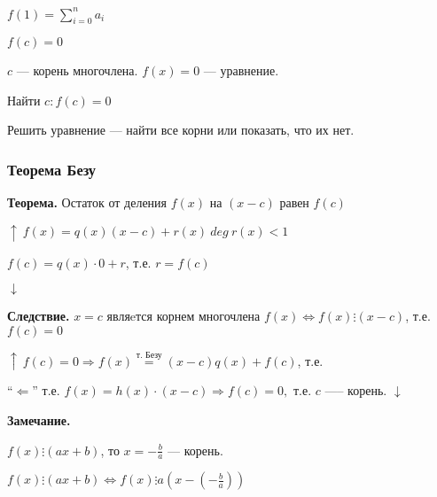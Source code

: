 \documentclass{article}
\begin{document}
    \(f(1) = \sum_{i=0}^n a_i\)

    \(f(c) = 0\)

    \(c\) --- корень многочлена. \(f(x) = 0\) --- уравнение.
    
    Найти \(c:f(c) = 0\)

    Решить уравнение --- найти все корни или показать, что их нет.

    \subsubsection{Теорема Безу}

    \textbf{Теорема.} Остаток от деления \(f(x)\) на \((x-c)\) равен \(f(c)\)

    \(\uparrow\ f(x) = q(x)(x-c) + r(x)\ deg\ r(x) < 1\)

    \(f(c) = q(x)\cdot 0 + r\), т.е. \(r=f(c)\)

    \(\downarrow\)

    \textbf{Следствие.} \(x = c\) являeтся корнем многочлена \(f(x) \Leftrightarrow f(x) \vdots (x-c)\), т.е. \(f(c) = 0\)

    \(\uparrow\ f(c) = 0 \Rightarrow f(x) \overset{\textrm{т. Безу}}{=} (x-c)q(x) + f(c)\), т.е.

    ``\(\Leftarrow\)'' т.е. \( f(x) = h(x)\cdot(x-c) \Rightarrow f(c) = 0,\) т.е. \(c\) —-- корень. \(\downarrow\)
    
    \textbf{Замечание.} 
        
    \(f(x)\vdots (ax+b)\), то \(x = -\frac{b}{a}\) --- корень.

    \(f(x) \vdots(ax+b) \Leftrightarrow f(x) \vdots a(x-(-\frac{b}{a})) \)
    
    
    
\end{document}
